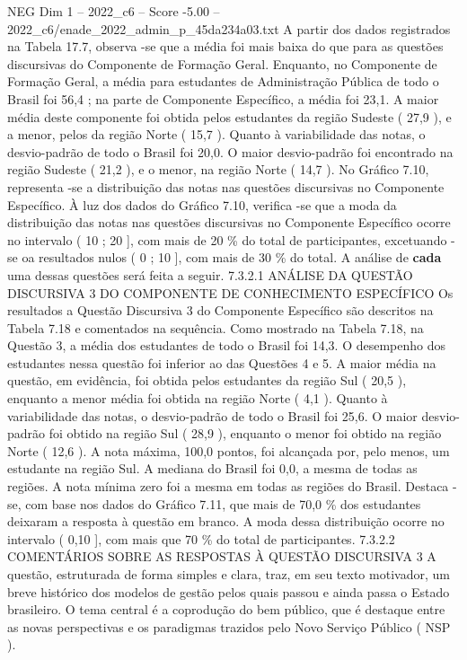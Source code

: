 \begin{textsample}{NEG Dim 1 – 2022\_c6 – Score -5.00 – 2022\_c6/enade\_2022\_admin\_p\_45da234a03.txt}
A partir dos dados registrados na Tabela 17.7, observa -se que a média foi mais baixa do que para as questões discursivas do Componente de Formação Geral.
Enquanto, no Componente de Formação Geral, a média para estudantes de Administração Pública de todo o Brasil foi 56,4 ; na parte de Componente Específico, a média foi 23,1.
A maior média deste componente foi obtida pelos estudantes da região Sudeste ( 27,9 ), e a menor, pelos da região Norte ( 15,7 ).
Quanto à variabilidade das notas, o desvio-padrão de todo o Brasil foi 20,0.
O maior desvio-padrão foi encontrado na região Sudeste ( 21,2 ), e o menor, na região Norte ( 14,7 ).
No Gráfico 7.10, representa -se a distribuição das notas nas questões discursivas no Componente Específico.
À luz dos dados do Gráfico 7.10, verifica -se que a moda da distribuição das notas nas questões discursivas no Componente Específico ocorre no intervalo ( 10 ; 20 ], com mais de 20 \% do total de participantes, excetuando -se oa resultados nulos ( 0 ; 10 ], com mais de 30 \% do total.
A análise de \textbf{cada} uma dessas questões será feita a seguir. 7.3.2.1 ANÁLISE DA QUESTÃO DISCURSIVA 3 DO COMPONENTE DE CONHECIMENTO ESPECÍFICO Os resultados a Questão Discursiva 3 do Componente Específico são descritos na Tabela 7.18 e comentados na sequência.
Como mostrado na Tabela 7.18, na Questão 3, a média dos estudantes de todo o Brasil foi 14,3.
O desempenho dos estudantes nessa questão foi inferior ao das Questões 4 e 5.
A maior média na questão, em evidência, foi obtida pelos estudantes da região Sul ( 20,5 ), enquanto a menor média foi obtida na região Norte ( 4,1 ).
Quanto à variabilidade das notas, o desvio-padrão de todo o Brasil foi 25,6.
O maior desvio-padrão foi obtido na região Sul ( 28,9 ), enquanto o menor foi obtido na região Norte ( 12,6 ).
A nota máxima, 100,0 pontos, foi alcançada por, pelo menos, um estudante na região Sul.
A mediana do Brasil foi 0,0, a mesma de todas as regiões.
A nota mínima zero foi a mesma em todas as regiões do Brasil.
Destaca -se, com base nos dados do Gráfico 7.11, que mais de 70,0 \% dos estudantes deixaram a resposta à questão em branco.
A moda dessa distribuição ocorre no intervalo ( 0,10 ], com mais que 70 \% do total de participantes. 7.3.2.2 COMENTÁRIOS SOBRE AS RESPOSTAS À QUESTÃO DISCURSIVA 3 A questão, estruturada de forma simples e clara, traz, em seu texto motivador, um breve histórico dos modelos de gestão pelos quais passou e ainda passa o Estado brasileiro.
O tema central é a coprodução do bem público, que é destaque entre as novas perspectivas e os paradigmas trazidos pelo Novo Serviço Público ( NSP ).

\end{textsample}
